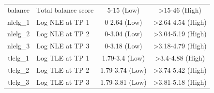 \documentclass[man,floatsintext]{apa6}
\begin{document}
\begin{longtable}[t]{c>{\raggedright\arraybackslash}p{5cm}cc}
balance & Total balance score & 5-15 (Low) & >15-46 (High)\\
nlelg\_1 & Log NLE at TP 1 & 0-2.64 (Low) & >2.64-4.54 (High)\\
nlelg\_2 & Log NLE at TP 2 & 0-3.04 (Low) & >3.04-5.19 (High)\\
nlelg\_3 & Log NLE at TP 3 & 0-3.18 (Low) & >3.18-4.79 (High)\\
tlelg\_1 & Log TLE at TP 1 & 1.79-3.4 (Low) & >3.4-4.88 (High)\\
tlelg\_2 & Log TLE at TP 2 & 1.79-3.74 (Low) & >3.74-5.42 (High)\\
tlelg\_3 & Log TLE at TP 3 & 1.79-3.81 (Low) & >3.81-5.18 (High)\\
\bottomrule
\end{longtable}

\begin{center}
\begin{ThreePartTable}


\end{ThreePartTable}
\end{center}
\end{document}
